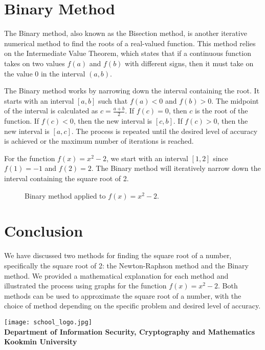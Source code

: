 \documentclass{article}
\newcommand{\footer}[1]{
\begin{flushright}
	\vspace{2em}
	\texttt{[image: school\_logo.jpg]} \\
	\vspace{1em}
	\textcolor{blue2}{\small\textbf{#1}}
\end{flushright}
}
\theoremstyle{definition}
\begin{document}
\section{Binary Method}

The Binary method, also known as the Bisection method, is another iterative numerical method to find the roots of a real-valued function. This method relies on the Intermediate Value Theorem, which states that if a continuous function takes on two values $f(a)$ and $f(b)$ with different signs, then it must take on the value 0 in the interval $(a, b)$.

The Binary method works by narrowing down the interval containing the root. It starts with an interval $[a, b]$ such that $f(a) < 0$ and $f(b) > 0$. The midpoint of the interval is calculated as $c = \frac{a+b}{2}$. If $f(c) = 0$, then $c$ is the root of the function. If $f(c) < 0$, then the new interval is $[c, b]$. If $f(c) > 0$, then the new interval is $[a, c]$. The process is repeated until the desired level of accuracy is achieved or the maximum number of iterations is reached.

For the function $f(x) = x^2 - 2$, we start with an interval $[1, 2]$ since $f(1) = -1$ and $f(2) = 2$. The Binary method will iteratively narrow down the interval containing the square root of 2.

\begin{figure}[ht]
	\centering
	\caption{Binary method applied to $f(x) = x^2 - 2$.}
\end{figure}

\section{Conclusion}

We have discussed two methods for finding the square root of a number, specifically the square root of 2: the Newton-Raphson method and the Binary method. We provided a mathematical explanation for each method and illustrated the process using graphs for the function $f(x) = x^2 - 2$. Both methods can be used to approximate the square root of a number, with the choice of method depending on the specific problem and desired level of accuracy.



\footer{Department of Information Security, Cryptography and Mathematics\\ Kookmin University}
\end{document}
